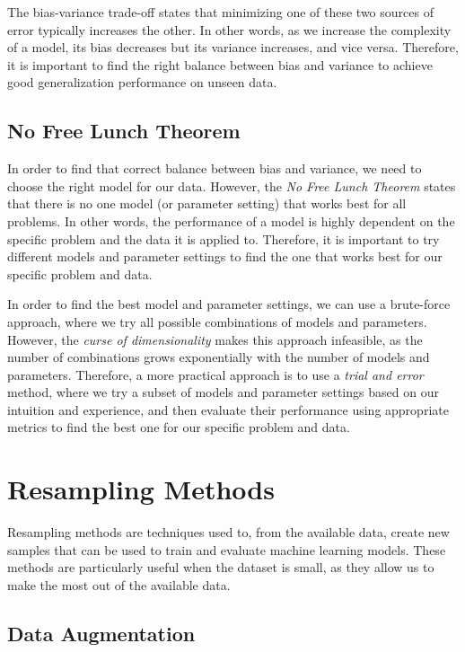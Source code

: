 The bias-variance trade-off states that minimizing one of these two sources of error typically increases the other. In other words,
as we increase the complexity of a model, its bias decreases but its variance increases, and vice versa. Therefore, it is important to find the right balance between bias and variance to achieve good generalization performance on unseen data.


\subsection{No Free Lunch Theorem}

In order to find that correct balance between bias and variance, we need to choose the right model for our data. However, the \emph{No Free Lunch Theorem} states that there is no one model (or parameter setting) that works best for all problems. In other words, the performance of a model is highly dependent on the specific problem and the data it is applied to. Therefore, it is important to try different models and parameter settings to find the one that works best for our specific problem and data.

In order to find the best model and parameter settings, we can use a brute-force approach, where we try all possible combinations of models and parameters. However, the \emph{curse of dimensionality} makes this approach infeasible, as the number of combinations grows exponentially with the number of models and parameters. Therefore, a more practical approach is to use a \emph{trial and error} method, where we try a subset of models and parameter settings based on our intuition and experience, and then evaluate their performance using appropriate metrics to find the best one for our specific problem and data.

\section{Resampling Methods}

Resampling methods are techniques used to, from the available data, create new samples that can be used to train and evaluate machine learning models. These methods are particularly useful when the dataset is small, as they allow us to make the most out of the available data.

\subsection{Data Augmentation}

